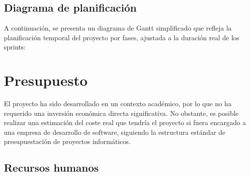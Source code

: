 \subsection{Diagrama de planificación}

A continuación, se presenta un diagrama de Gantt simplificado que refleja la planificación temporal del proyecto por fases, ajustada a la duración real de los sprints:

\begin{center}
\end{center}

\section{Presupuesto}

El proyecto ha sido desarrollado en un contexto académico, por lo que no ha requerido una inversión económica directa significativa. No obstante, es posible realizar una estimación del coste real que tendría el proyecto si fuera encargado a una empresa de desarrollo de software, siguiendo la estructura estándar de presupuestación de proyectos informáticos.

\subsection{Recursos humanos}

